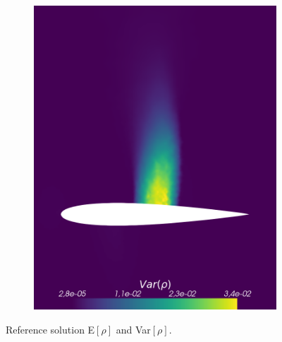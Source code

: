 \begin{figure}[h!]
\begin{subfigure}{0.5\linewidth}
				\includegraphics[scale=0.2]{figs/Euler2D/sc50UncertainMaSigma0-025PSigma1000-0Dim2_VarRho.png}
		\label{fig:referenceSolutionsub2}
	\end{subfigure}
	\caption{Reference solution E$[\rho]$ and Var$[\rho]$.}
	\label{fig:referenceSolution2D}
\end{figure}
